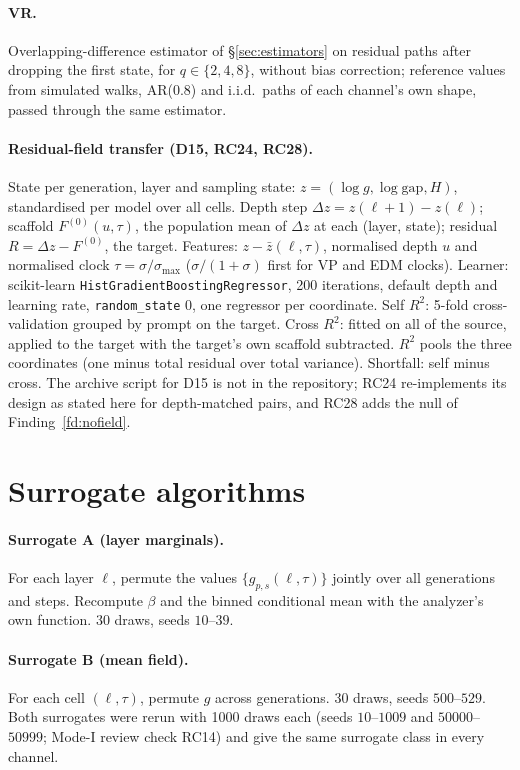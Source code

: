 \documentclass[11pt]{article}
\theoremstyle{definition}
\newcommand{\gap}{\mathrm{gap}}
\begin{document}
\paragraph{VR.} Overlapping-difference estimator of \S\ref{sec:estimators} on residual paths after dropping the first state, for $q\in\{2,4,8\}$, without bias correction; reference values from simulated walks, AR(0.8) and i.i.d.\ paths of each channel's own shape, passed through the same estimator.

\paragraph{Residual-field transfer (D15, RC24, RC28).} State per generation, layer and sampling state: $z=(\log g,\log\gap,H)$, standardised per model over all cells. Depth step $\Delta z=z(\ell+1)-z(\ell)$; scaffold $F^{(0)}(u,\tau)$, the population mean of $\Delta z$ at each (layer, state); residual $R=\Delta z-F^{(0)}$, the target. Features: $z-\bar z(\ell,\tau)$, normalised depth $u$ and normalised clock $\tau=\sigma/\sigma_{\max}$ ($\sigma/(1+\sigma)$ first for VP and EDM clocks). Learner: scikit-learn \texttt{HistGradientBoostingRegressor}, 200 iterations, default depth and learning rate, \texttt{random\_state} 0, one regressor per coordinate. Self $R^2$: 5-fold cross-validation grouped by prompt on the target. Cross $R^2$: fitted on all of the source, applied to the target with the target's own scaffold subtracted. $R^2$ pools the three coordinates (one minus total residual over total variance). Shortfall: self minus cross. The archive script for D15 is not in the repository; RC24 re-implements its design as stated here for depth-matched pairs, and RC28 adds the null of Finding~\ref{fd:nofield}.

\section{Surrogate algorithms}\label{app:surrogates}
\paragraph{Surrogate A (layer marginals).} For each layer $\ell$, permute the values $\{g_{p,s}(\ell,\tau)\}$ jointly over all generations and steps. Recompute $\beta$ and the binned conditional mean with the analyzer's own function. 30 draws, seeds $10$--$39$.
\paragraph{Surrogate B (mean field).} For each cell $(\ell,\tau)$, permute $g$ across generations. 30 draws, seeds $500$--$529$. Both surrogates were rerun with 1000 draws each (seeds $10$--$1009$ and $50000$--$50999$; Mode-I review check RC14) and give the same surrogate class in every channel.
\end{document}
